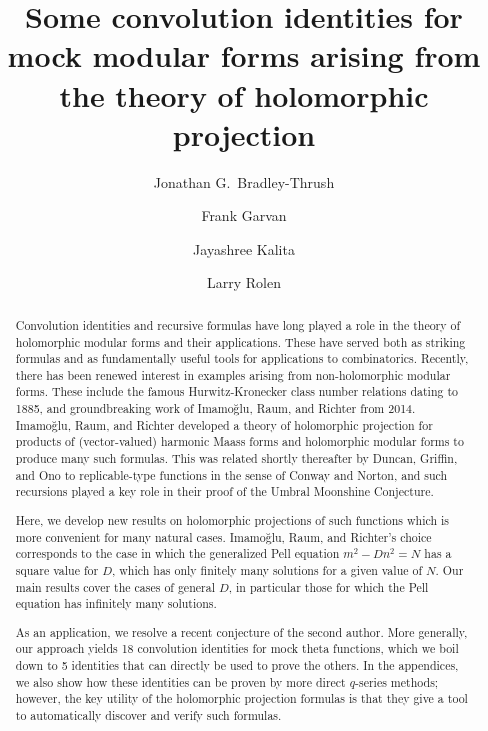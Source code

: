 \documentclass[11pt,reqno]{amsart}
\title{Some convolution identities for mock modular forms arising from the theory of holomorphic projection}
\author{Jonathan G.~Bradley-Thrush}
\author{Frank Garvan}
\author{Jayashree Kalita}
\author{Larry Rolen}
\renewcommand{\=}{\;=\;}
\theoremstyle{myremark}
\begin{document}
\begin{abstract}
Convolution identities and recursive formulas have long played a role in the theory of holomorphic modular forms and their applications. These have served both as striking formulas and as  fundamentally useful tools for applications to combinatorics. Recently, there has been renewed interest in examples arising from non-holomorphic modular forms. These include the famous Hurwitz-Kronecker class number relations dating to 1885, and groundbreaking work of Imamo\u{g}lu, Raum, and Richter from 2014. Imamo\u{g}lu, Raum, and Richter developed a theory of holomorphic projection for products of (vector-valued) harmonic Maass forms and holomorphic modular forms to produce many such formulas. This was related shortly thereafter by Duncan, Griffin, and Ono to replicable-type functions in the sense of Conway and Norton, and such recursions played a key role in their proof of the Umbral Moonshine Conjecture. 

Here, we develop new results on holomorphic projections of such functions which is more convenient for many natural cases. Imamo\u{g}lu, Raum, and Richter's  choice corresponds to the case in which the generalized Pell equation $m^2 - Dn^2 = N$ has a square value for $D$,  which has only finitely many solutions for a given value of $N$. Our main results cover the cases of general $D$, in particular those for which the Pell equation has infinitely many solutions. 

As an application, we resolve a recent conjecture of the second author. More generally, our approach yields 18 convolution identities for mock theta functions, which we boil down to 5 identities that can directly be used to prove the others. In the appendices, we also show how these identities can be proven by more direct $q$-series methods; however, the key utility of the holomorphic projection formulas is that they give a tool to automatically discover and verify such formulas.
\end{abstract}

\maketitle
\end{document}
